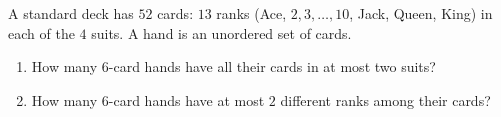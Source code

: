 A standard deck has $52$ cards: $13$ ranks (Ace, $2,3,\dots,10$, Jack, Queen, King) in each of the $4$ suits. A hand is an unordered set of cards.
\begin{enumerate}
\item[(a)] How many $6$-card hands have all their cards in at most two suits?
\item[(b)] How many $6$-card hands have at most $2$ different ranks among their cards?
\end{enumerate}
